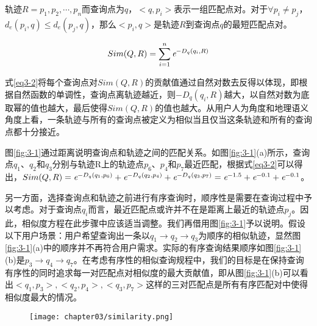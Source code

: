 \theoremstyle{definition}
\begin{definition}
	轨迹$R={p_{1}, p_{2}, \cdots, p_{n}}$而查询点为$q$，$<q, p_{i}>$表示一组匹配点对。对于$\forall p_{i} \neq p_{j}$， $d_{e}(p_{i}, q)\leq d_{e}(p_{j}, q)$，那么$<p_{i}, q>$是轨迹$R$到查询点$q$的最短匹配点对。
\end{definition}

\begin{equation}
	\label{eq3-2}
	Sim(Q,R) = \sum_{i=1}^{n} \emph{e}^{-D_{q}(q_{i}, R)}
\end{equation}

式\ref{eq3-2}将每个查询点对$Sim(Q,R)$的贡献值通过自然对数去反得以体现，即根据自然函数的单调性，查询点离轨迹越近，则$-D_{q}(q_{i}, R)$越大，以自然对数为底取幂的值也越大，最后使得$Sim(Q,R)$的值也越大。从用户人为角度和地理语义角度上看，一条轨迹与所有的查询点被定义为相似当且仅当这条轨迹和所有的查询点都十分接近。

图\ref{fig:3-1}通过距离说明查询点和轨迹之间的匹配关系。如图\ref{fig:3-1}(a)所示，查询点$q_{1}$、$q_{2}$和$q_{3}$分别与轨迹R上的轨迹点$p_{6}$、$p_{4}$和$p_{7}$最近匹配，根据式\ref{eq3-2}可以得出，$Sim(Q,R) = \emph{e}^{-D_{q}(q_{1}, p_{6})} + \emph{e}^{-D_{q}(q_{2}, p_{4})} + \emph{e}^{-D_{q}(q_{3}, p_{7})} = \emph{e}^{-1.5}+ \emph{e}^{-0.1} + \emph{e}^{-0.1}$。

另一方面，选择查询点和轨迹之前进行有序查询时，顺序性是需要在查询过程中予以考虑。对于查询点$q_{i}$而言，最近匹配点或许并不在是距离上最近的轨迹点$p_{j}$。因此，相似度方程在此步骤中应该适当调整。我们再借用图\ref{fig:3-1}予以说明。假设以下用户场景：用户希望查询出一条以$q_{1} \rightarrow q_{2} \rightarrow q_{3}$为顺序的相似轨迹，显然图\ref{fig:3-1}(a)中的顺序并不再符合用户需求。实际的有序查询结果顺序如图\ref{fig:3-1}(b)是$p_{3} \rightarrow q_{4} \rightarrow q_{7}$。在考虑有序性的相似查询规程中，我们的目标是在保持查询有序性的同时追求每一对匹配点对相似度的最大贡献值，即从图\ref{fig:3-1}(b)可以看出$<q_{1},p_{3}>, <q_{2},p_{4}>, <q_{3},p_{7}>$这样的三对匹配点是所有有序匹配对中使得相似度最大的情况。

\begin{figure}[!htp]
  \centering
  \texttt{[image: chapter03/similarity.png]}
\end{figure}

